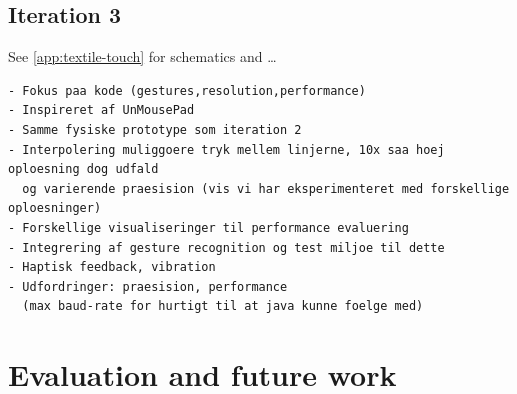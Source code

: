 \subsection{Iteration 3}
See \ref{app:textile-touch} for schematics and \dots
\begin{verbatim}
- Fokus paa kode (gestures,resolution,performance)
- Inspireret af UnMousePad
- Samme fysiske prototype som iteration 2
- Interpolering muliggoere tryk mellem linjerne, 10x saa hoej oploesning dog udfald 
  og varierende praesision (vis vi har eksperimenteret med forskellige oploesninger)
- Forskellige visualiseringer til performance evaluering
- Integrering af gesture recognition og test miljoe til dette
- Haptisk feedback, vibration
- Udfordringer: praesision, performance 
  (max baud-rate for hurtigt til at java kunne foelge med)
\end{verbatim}

\section{Evaluation and future work}